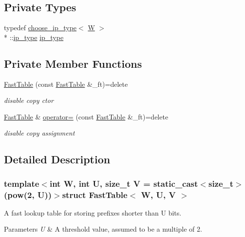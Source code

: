 \subsection*{Private Types}
\begin{DoxyCompactItemize}
\item 
typedef \hyperlink{types_8h_structchoose__ip__type}{choose\-\_\-ip\-\_\-type}$<$ \hyperlink{test__u128_8cpp_ab21b528bc38899d04d3a7053e52fb797}{W} $>$\\*
\-::\hyperlink{structFastTable_ab9dad4b2ee8234f75a7bb5da2331b6e5}{ip\-\_\-type} \hyperlink{structFastTable_ab9dad4b2ee8234f75a7bb5da2331b6e5}{ip\-\_\-type}
\end{DoxyCompactItemize}
\subsection*{Private Member Functions}
\begin{DoxyCompactItemize}
\item 
\hyperlink{structFastTable_a5a27a8e518689de1ad72459037c8281e}{Fast\-Table} (const \hyperlink{structFastTable}{Fast\-Table} \&\-\_\-ft)=delete
\begin{DoxyCompactList}\small\item\em disable copy ctor \end{DoxyCompactList}\item 
\hyperlink{structFastTable}{Fast\-Table} \& \hyperlink{structFastTable_afdf153dd5c7092d64ca93f2192b770a0}{operator=} (const \hyperlink{structFastTable}{Fast\-Table} \&\-\_\-ft)=delete
\begin{DoxyCompactList}\small\item\em disable copy assignment \end{DoxyCompactList}\end{DoxyCompactItemize}


\subsection{Detailed Description}
\subsubsection*{template$<$int W, int U, size\-\_\-t V = static\-\_\-cast$<$size\-\_\-t$>$(pow(2, U))$>$struct Fast\-Table$<$ W, U, V $>$}

A fast lookup table for storing prefixes shorter than U bits. 


\begin{DoxyParams}{Parameters}
{\em U} & A threshold value, assumed to be a multiple of 2. \\
\hline
\end{DoxyParams}


